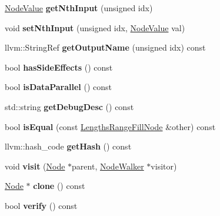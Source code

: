 \begin{DoxyCompactItemize}
\hyperlink{structglow_1_1_node_value}{Node\+Value} {\bfseries get\+Nth\+Input} (unsigned idx)
\item 
\mbox{\label{classglow_1_1_lengths_range_fill_node_a0f5761633688538bee9efd06168dccd1}} 
void {\bfseries set\+Nth\+Input} (unsigned idx, \hyperlink{structglow_1_1_node_value}{Node\+Value} val)
\item 
\mbox{\label{classglow_1_1_lengths_range_fill_node_ae241e83181d3478eedce7d1bfd967335}} 
llvm\+::\+String\+Ref {\bfseries get\+Output\+Name} (unsigned idx) const
\item 
\mbox{\label{classglow_1_1_lengths_range_fill_node_ad91623e2618d8a414926161f615a9628}} 
bool {\bfseries has\+Side\+Effects} () const
\item 
\mbox{\label{classglow_1_1_lengths_range_fill_node_ad2e655477e8fea4c67a0eebb09278ab6}} 
bool {\bfseries is\+Data\+Parallel} () const
\item 
\mbox{\label{classglow_1_1_lengths_range_fill_node_aaf1443933e0e0bddaa67a97cf479013d}} 
std\+::string {\bfseries get\+Debug\+Desc} () const
\item 
\mbox{\label{classglow_1_1_lengths_range_fill_node_a2004fa814dbb81fb64b92fa000c5d44f}} 
bool {\bfseries is\+Equal} (const \hyperlink{classglow_1_1_lengths_range_fill_node}{Lengths\+Range\+Fill\+Node} \&other) const
\item 
\mbox{\label{classglow_1_1_lengths_range_fill_node_a6cf9d6674d5e3ee42d2d9f2beb665e23}} 
llvm\+::hash\+\_\+code {\bfseries get\+Hash} () const
\item 
\mbox{\label{classglow_1_1_lengths_range_fill_node_a87b572939a43861146148c218197a6f0}} 
void {\bfseries visit} (\hyperlink{classglow_1_1_node}{Node} $\ast$parent, \hyperlink{classglow_1_1_node_walker}{Node\+Walker} $\ast$visitor)
\item 
\mbox{\label{classglow_1_1_lengths_range_fill_node_af68990096e6cb75634f4ddd9f827e8dd}} 
\hyperlink{classglow_1_1_node}{Node} $\ast$ {\bfseries clone} () const
\item 
\mbox{\label{classglow_1_1_lengths_range_fill_node_a8d685e29f9b30b0f73623d918b51f580}} 
bool {\bfseries verify} () const
\end{DoxyCompactItemize}
